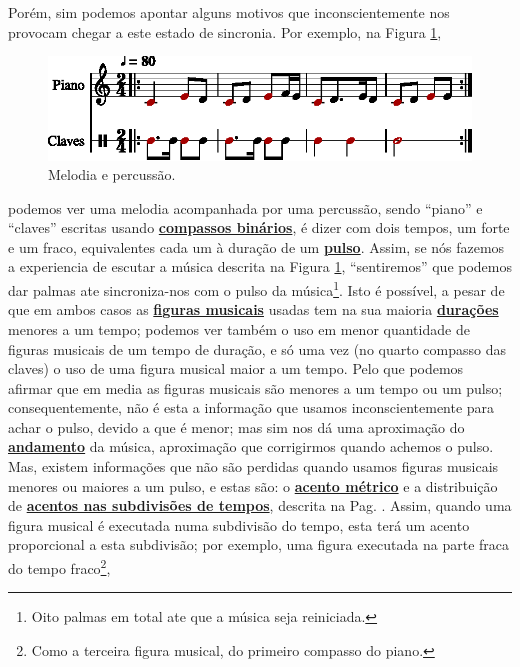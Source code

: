 Porém, sim podemos apontar alguns motivos que inconscientemente nos provocam chegar a este estado de sincronia.
Por exemplo, na Figura \ref{ritmo:procurando-pulso1},
\begin{figure}[!h]
\centering
    \includegraphics[width=\textwidth]{chapters/cap-musicalidade-percepcion/procurando-pulso1-1.eps}
\caption{Melodia e percussão.}
\label{ritmo:procurando-pulso1}
\end{figure}
podemos ver uma melodia acompanhada por uma percussão,
sendo ``piano'' e ``claves'' escritas usando  \hyperref[subsec:compassobinario]{\textbf{compassos binários}}, 
é dizer com dois tempos, um forte e um fraco, equivalentes cada um à duração de um \hyperref[ref:Pulso]{\textbf{pulso}}.
Assim, se nós fazemos a experiencia de escutar a música descrita na Figura \ref{ritmo:procurando-pulso1},
``sentiremos'' que podemos dar palmas ate sincroniza-nos com o pulso da música\footnote{Oito
palmas em total ate que a música seja reiniciada.}.
Isto é possível, 
a pesar de que em ambos casos as \hyperref[sec:figurasmusicais]{\textbf{figuras musicais}} usadas tem na sua maioria
\hyperref[sec:pos:Duracion]{\textbf{durações}} menores a um tempo;
podemos ver também o uso em menor quantidade de figuras musicais de um tempo de duração,
e só uma vez (no quarto compasso das claves) o uso de uma figura musical maior a um tempo. 
Pelo que podemos afirmar que em media as figuras musicais são menores a um tempo ou um pulso; consequentemente, 
não é esta a informação que usamos inconscientemente para achar o pulso,
devido a que é menor;
mas sim nos dá uma  aproximação do \hyperref[sec:Andamento]{\textbf{andamento}} da música,
aproximação que corrigirmos quando achemos o pulso.
Mas, existem informações que não são perdidas quando usamos figuras musicais menores ou maiores a um pulso,
e estas  são: o \hyperref[def:acentometrico]{\textbf{acento métrico}} e a 
distribuição de \hyperref[eq:acentosubdividio]{\textbf{acentos nas subdivisões de tempos}},
descrita na Pag. \pageref{eq:acentosubdividio}.
Assim, quando uma figura musical  é executada numa subdivisão do tempo, 
esta terá um acento proporcional a esta subdivisão;
por exemplo, uma figura executada na parte fraca do tempo fraco\footnote{Como
a terceira figura musical, do primeiro compasso do piano.}, 
